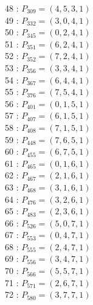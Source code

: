 \documentclass{article}
\begin{document}
{\begin{multicols}{3}
48 : $P_{309}=( 4, 5, 3, 1 )$\\
49 : $P_{332}=( 3, 0, 4, 1 )$\\
50 : $P_{345}=( 0, 2, 4, 1 )$\\
51 : $P_{351}=( 6, 2, 4, 1 )$\\
52 : $P_{352}=( 7, 2, 4, 1 )$\\
53 : $P_{356}=( 3, 3, 4, 1 )$\\
54 : $P_{367}=( 6, 4, 4, 1 )$\\
55 : $P_{376}=( 7, 5, 4, 1 )$\\
56 : $P_{401}=( 0, 1, 5, 1 )$\\
57 : $P_{407}=( 6, 1, 5, 1 )$\\
58 : $P_{408}=( 7, 1, 5, 1 )$\\
59 : $P_{448}=( 7, 6, 5, 1 )$\\
60 : $P_{455}=( 6, 7, 5, 1 )$\\
61 : $P_{465}=( 0, 1, 6, 1 )$\\
62 : $P_{467}=( 2, 1, 6, 1 )$\\
63 : $P_{468}=( 3, 1, 6, 1 )$\\
64 : $P_{476}=( 3, 2, 6, 1 )$\\
65 : $P_{483}=( 2, 3, 6, 1 )$\\
66 : $P_{526}=( 5, 0, 7, 1 )$\\
67 : $P_{553}=( 0, 4, 7, 1 )$\\
68 : $P_{555}=( 2, 4, 7, 1 )$\\
69 : $P_{556}=( 3, 4, 7, 1 )$\\
70 : $P_{566}=( 5, 5, 7, 1 )$\\
71 : $P_{571}=( 2, 6, 7, 1 )$\\
72 : $P_{580}=( 3, 7, 7, 1 )$\\
\end{multicols}


%


%


}%
\end{document}
